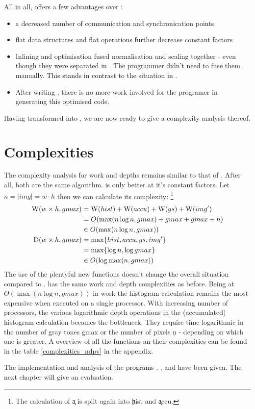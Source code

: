   All in all, \ndpv offers a few advantages over \ndpn:
  \begin{itemize}
    \item a decreased number of communication and synchronication points
    \item flat data structures and flat operations further decrease constant factors
    \item Inlining and optimisation fused
          normalisation and scaling together - even though
          they were separated in \ndpn. The programmer didn't
          need to fuse them manually. This stands in contrast to the situation in \man.
    \item After writing \ndpn, there is no more work involved for the programer in generating this optimised code.
  \end{itemize}
  Having transformed \ndpn into \ndpv, we are now ready to give a complexity analysis thereof.
  
\section{Complexities}
  The complexity analysis for work and depths remains similar to that of \ndpn.
  After all, both are the same algorithm. \ndpv is only better at it's constant factors.
  Let $n = |img| = w\cdot h$ then we can calculate its complexity:
  \footnote{
  The calculation of \c{a} is split again into \c{hist} and \c{accu}.
  }
  \begin{equation*}
  \begin{split}
  \W(w \times h,gmax)
        & = \W(hist) + \W(accu) + \W(gs) + \comment{\W(expandPS) +} \W(img') \\
        & = O( \max(n \log n, gmax) + gmax + gmax \comment{ + 1} + n) \\
        & \in O(\max(n \log n, gmax)) \\
  \D(w \times h,gmax)
      & = \max \{ hist, accu, gs\comment{, expandPS}, img'\} \\
      & = \max \{\log n, \log gmax \} \\
      & \in O(\log \max(n,gmax)) \\
  \end{split}
  \end{equation*}
  The use of the plentyful new functions doesn't change the overall situation compared to \ndpn.
  \ndpv has the same work and depth complexities as before.
  Being at $O(\max(n \log n,gmax))$ in work
  the histogram calculation remains the most expensive when executed on a single processor.
  With increasing number of processors, the various logarithmic depth
  operations in the (accumulated) histogram calculation becomes the bottleneck.
  They require time logarithmic in the number of gray tones \c{gmax} or the number
  of pixels \c{n} - depending on which one is greater.
  A overview of all the functions an their complexities can be found in the table \ref{complexities_ndpv} in the appendix.
  
  
  The implementation and analysis of the programs \seq, \man, \ndpn and \ndpv
  have been given. The next chapter will give an evaluation.

